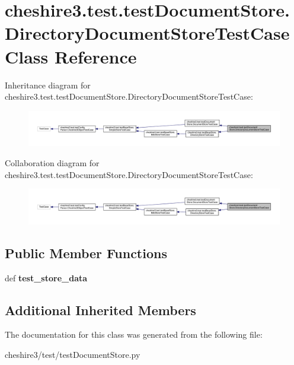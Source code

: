 \hypertarget{classcheshire3_1_1test_1_1test_document_store_1_1_directory_document_store_test_case}{\section{cheshire3.\-test.\-test\-Document\-Store.\-Directory\-Document\-Store\-Test\-Case Class Reference}
\label{classcheshire3_1_1test_1_1test_document_store_1_1_directory_document_store_test_case}
}


Inheritance diagram for cheshire3.\-test.\-test\-Document\-Store.\-Directory\-Document\-Store\-Test\-Case\-:
\nopagebreak
\begin{figure}[H]
\begin{center}
\leavevmode
\includegraphics[width=350pt]{classcheshire3_1_1test_1_1test_document_store_1_1_directory_document_store_test_case__inherit__graph}
\end{center}
\end{figure}


Collaboration diagram for cheshire3.\-test.\-test\-Document\-Store.\-Directory\-Document\-Store\-Test\-Case\-:
\nopagebreak
\begin{figure}[H]
\begin{center}
\leavevmode
\includegraphics[width=350pt]{classcheshire3_1_1test_1_1test_document_store_1_1_directory_document_store_test_case__coll__graph}
\end{center}
\end{figure}
\subsection*{Public Member Functions}
\begin{DoxyCompactItemize}
\item 
\hypertarget{classcheshire3_1_1test_1_1test_document_store_1_1_directory_document_store_test_case_a8dca2ac16f375b3dc688ac49ffbc2b43}{def {\bfseries test\-\_\-store\-\_\-data}}\label{classcheshire3_1_1test_1_1test_document_store_1_1_directory_document_store_test_case_a8dca2ac16f375b3dc688ac49ffbc2b43}

\end{DoxyCompactItemize}
\subsection*{Additional Inherited Members}


The documentation for this class was generated from the following file\-:\begin{DoxyCompactItemize}
\item 
cheshire3/test/test\-Document\-Store.\-py\end{DoxyCompactItemize}
